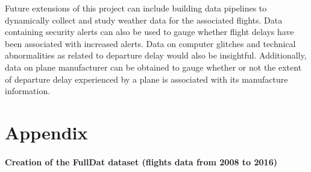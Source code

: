 \documentclass[12pt,twoside]{amherstthesis}
\begin{document}
  Future extensions of this project can include building data pipelines to
  dynamically collect and study weather data for the associated flights.
  Data containing security alerts can also be used to gauge whether flight
  delays have been associated with increased alerts. Data on computer
  glitches and technical abnormalities as related to departure delay would
  also be insightful. Additionally, data on plane manufacturer can be
  obtained to gauge whether or not the extent of departure delay
  experienced by a plane is associated with its manufacture information.
  
  \appendix
  
  \chapter{Appendix}\label{appendix}
  
  \subsubsection{Creation of the FullDat dataset (flights data from 2008
  to
  2016)}\label{creation-of-the-fulldat-dataset-flights-data-from-2008-to-2016}
  
\end{document}
